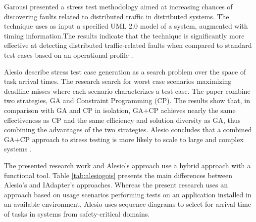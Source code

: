 \documentclass[conference]{IEEEtran}
\begin{document}
Garousi presented a stress test methodology aimed at increasing chances of discovering faults related to distributed traffic in distributed systems. The technique uses as input a specified UML 2.0 model of a system, augmented with timing information.The results indicate that the technique is significantly more effective at detecting distributed traffic-related faults when compared to standard test cases based on an operational profile \cite{Garousi2006}.

Alesio describe stress test case generation as a search problem over the space of task arrival times. The research search for worst case scenarios maximizing deadline misses where each scenario characterizes a test case. The paper combine two strategies, GA and Constraint Programming (CP). The results show that, in comparison with GA and CP in isolation, GA+CP achieves nearly the same effectiveness as CP and the same efficiency and solution diversity as GA, thus combining the advantages of the two strategies. Alesio concludes that a combined GA+CP approach to stress testing is more likely to scale to large and complex systems \cite{Alesio2015}.

The presented research work and Alesio's approach \cite{Alesio2015} use a hybrid approach with a functional tool. Table \ref{tab:alesiogois} presents the main differences between Alesio's and IAdapter's approaches. Whereas the present research uses an approach based on usage scenarios performing tests on an application installed in an available environment, Alesio uses sequence diagrams  to select for arrival time of tasks in systems from  safety-critical domains. 
\end{document}
